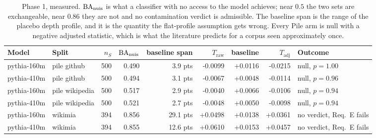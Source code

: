 \begin{table}[t]
\small
\centering
\setlength{\tabcolsep}{5pt}
\begin{tabular}{@{}llrrrrrrl@{}}
\toprule
Model & Split & $n_S$ & $\mathrm{BA}_{\mathrm{nuis}}$ & baseline span & $T_{\mathrm{raw}}$ & baseline & $T_{\mathrm{adj}}$ & Outcome \\
\midrule
pythia-160m & pile github & 500 & 0.490 & 3.9 pts & -0.0099 & +0.0116 & -0.0215 & null, $p=1.00$ \\
pythia-410m & pile github & 500 & 0.494 & 3.1 pts & -0.0067 & +0.0048 & -0.0114 & null, $p=0.96$ \\
pythia-160m & pile wikipedia & 500 & 0.517 & 2.9 pts & -0.0040 & +0.0066 & -0.0106 & null, $p=0.94$ \\
pythia-410m & pile wikipedia & 500 & 0.521 & 2.7 pts & -0.0048 & +0.0050 & -0.0098 & null, $p=0.94$ \\
pythia-160m & wikimia & 394 & 0.856 & 29.1 pts & +0.0498 & +0.0138 & +0.0361 & no verdict, Req.\ E fails \\
pythia-410m & wikimia & 394 & 0.855 & 12.6 pts & +0.0610 & +0.0153 & +0.0457 & no verdict, Req.\ E fails \\
\bottomrule
\end{tabular}
\caption{Phase 1, measured. $\mathrm{BA}_{\mathrm{nuis}}$ is what a classifier with no access to the model achieves; near $0.5$ the two sets are exchangeable, near $0.86$ they are not and no contamination verdict is admissible. The baseline span is the range of the placebo depth profile, and it is the quantity the flat-profile assumption gets wrong. Every Pile arm is null with a negative adjusted statistic, which is what the literature predicts for a corpus seen approximately once.}
\label{tab:phase1}
\end{table}

